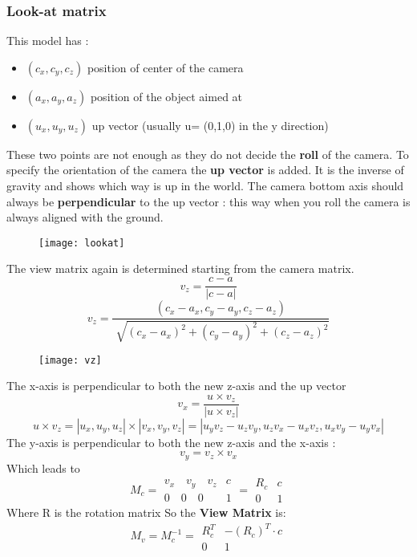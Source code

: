 \subsubsection{Look-at matrix}
This model has :
\begin{itemize}
\item $(c_x,c_y,c_z)$ position of center of the camera
\item $(a_x,a_y,a_z)$ position of the object aimed at
\item $(u_x,u_y,u_z) $ up vector (usually u= (0,1,0) in the y direction)
\end{itemize}
These two points are not enough as they do not decide the \textbf{roll} of the camera. To specify the orientation of the camera the \textbf{up vector} is added.
It is the inverse of gravity and shows which way is up in the world. The camera bottom axis should always be \textbf{perpendicular} to the up vector : this way when you roll the camera is always aligned with the ground.\\
\begin{figure}[H]
  \centering
  \texttt{[image: lookat]}
\end{figure}
\newpage
The view matrix again is determined starting from the camera matrix.
$$ v_z = \frac{c-a}{|c-a|}$$
$$ v_z = \frac{(c_x-a_x,c_y-a_y,c_z-a_z)}{\sqrt[]{(c_x-a_x)^2+(c_y-a_y)^2+(c_z-a_z)^2}} $$
\begin{figure}[H]
  \centering
  \texttt{[image: vz]}
\end{figure}
The x-axis is perpendicular to both the new z-axis and the up vector 
$$ v_x = \frac{u \times v_z}{|u \times v_z|}$$
$$ u \times v_z = |u_x,u_y,u_z| \times |v_x,v_y,v_z| = |u_yv_z-u_zv_y,u_zv_x-u_xv_z,u_xv_y-u_yv_x|$$
The y-axis is perpendicular to both the new z-axis and the x-axis :
$$ v_y = v_z \times v_x$$
Which leads to 
\[
\boxed{M_c=\begin{array}{c|c}
  v_x \quad v_y \quad v_z& c \\ 
  \hline
  0 \quad 0 \quad 0  & 1
 \end{array} = \begin{array}{c|c}
  R_c & c \\ 
  \hline
  0 & 1
 \end{array}}
\]
Where R is the rotation matrix
So the \textbf{View Matrix} is: 
\[
\boxed{M_v=M_c^{-1}=\begin{array}{c|c}
  R_c^{T} & -(R_c)^T \cdot c \\ 
  \hline
  0  & 1
 \end{array}}
\]
\newpage
